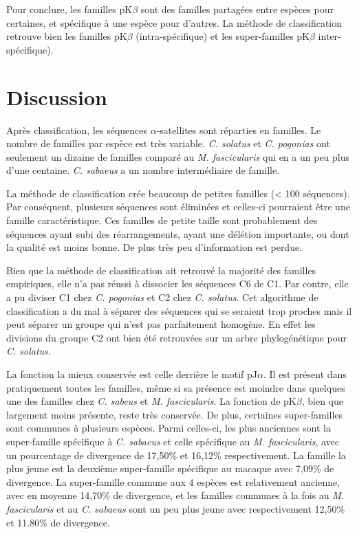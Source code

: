 \documentclass[12pt,a4paper]{article}
\begin{document}
	Pour conclure, les familles pK$\beta$ sont des familles partagées entre espèces pour certaines, et spécifique à une espèce pour d'autres. La méthode de classification retrouve bien les familles pK$\beta$ (intra-spécifique) et les super-familles pK$\beta$ inter-spécifique).

\section{Discussion}

	Après classification, les séquences $\alpha$-satellites sont réparties en familles. Le nombre de familles par espèce est très variable. \textit{C. solatus} et \textit{C. pogonias} ont seulement un dizaine de familles comparé au \textit{M. fascicularis} qui en a un peu plus d'une centaine. \textit{C. sabaeus} a un nombre intermédiaire de famille.

	La méthode de classification crée beaucoup de petites familles (< 100 séquences). Par conséquent, plusieurs séquences sont éliminées et celles-ci pourraient être  une famille caractéristique. Ces familles de petite taille sont probablement des séquences ayant subi des réarrangements, ayant une délétion importante, ou dont la qualité est moins bonne. De plus très peu d'information est perdue.

	Bien que la méthode de classification ait retrouvé la majorité des familles empiriques, elle n'a pas réussi à dissocier les séquences C6 de C1. Par contre, elle a pu diviser C1 chez \textit{C. pogonias} et C2  chez \textit{C. solatus}. Cet algorithme de classification a du mal à séparer des séquences qui se seraient trop proches mais il peut séparer un groupe qui n'est pas parfaitement homogène. En effet les divisions du groupe C2 ont bien été retrouvées sur un arbre phylogénétique pour \textit{C. solatus}.

	La fonction la mieux conservée est celle derrière le motif pJ$\alpha$. Il est présent dans pratiquement toutes les familles, même si sa présence est moindre dans quelques une des familles chez \textit{C. sabeus} et \textit{M. fascicularis}. La fonction de pK$\beta$, bien que largement moins présente, reste très conservée. De plus, certaines super-familles sont communes à plusieurs espèces. Parmi celles-ci, les plus anciennes sont la super-famille spécifique à \textit{C. sabaeus} et celle spécifique au \textit{M. fascicularis}, avec un pourcentage de divergence de 17,50\% et 16,12\% respectivement. La famille la plus jeune est la deuxième super-famille spécifique au macaque avec 7,09\% de divergence.  La super-famille commune aux 4 espèces est relativement ancienne, avec en moyenne 14,70\% de divergence, et les familles communes à la fois au \textit{M. fascicularis} et au \textit{C. sabaeus} sont un peu plus jeune avec respectivement 12,50\% et 11.80\% de divergence.
\end{document}
